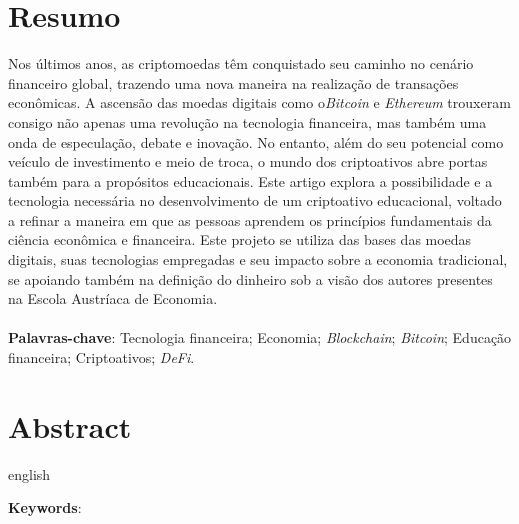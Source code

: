 \documentclass[article,12pt,oneside,a4paper,english,brazil]{unifil}
\date{}
\begin{document}
\frenchspacing
\maketitle
\normalsize

\fontsize{10}{1}\selectfont
\section*{Resumo}
Nos últimos anos, as criptomoedas têm conquistado seu caminho no cenário financeiro global, trazendo uma nova maneira na realização de transações econômicas. A ascensão das moedas digitais como o\textit{Bitcoin} e \textit{Ethereum} trouxeram consigo não apenas uma revolução na tecnologia financeira, mas também uma onda de especulação, debate e inovação. No entanto, além do seu potencial como veículo de investimento e meio de troca, o mundo dos criptoativos abre portas também para a propósitos educacionais. Este artigo explora a possibilidade e a tecnologia necessária no desenvolvimento de um criptoativo educacional, voltado a refinar a maneira em que as pessoas aprendem os princípios fundamentais da ciência econômica e financeira. Este projeto se utiliza das bases das moedas digitais, suas tecnologias empregadas e seu impacto sobre a economia tradicional, se apoiando também na definição do dinheiro sob a visão dos autores presentes na Escola Austríaca de Economia.\\
\vspace{\onelineskip} \\
\noindent
\textbf{Palavras-chave}: Tecnologia financeira; Economia; \textit{Blockchain}; \textit{Bitcoin}; Educação financeira; Criptoativos; \textit{DeFi}.



\section*{Abstract}
\begin{otherlanguage*}{english}

\noindent
\textbf{Keywords}: 
\end{otherlanguage*}
\end{document}
